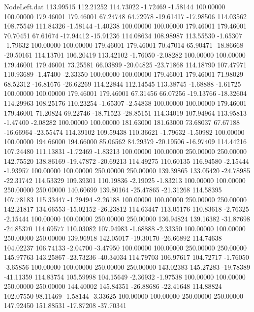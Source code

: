 \begin{filecontents}{NodeLeft.dat}
 113.99515  112.21252  114.73022    -1.72469   -1.58144  100.00000  100.00000  179.46001  179.46001   67.24748   64.72978  -19.61417  -17.98506
 114.03562  108.75549  111.84326    -1.58144   -1.40238  100.00000  100.00000  179.46001  179.46001   70.70451   67.61674  -17.94412  -15.91236
 114.08634  108.98987  113.55530    -1.65307   -1.79632  100.00000  100.00000  179.46001  179.46001   70.47014   65.90471  -18.86668  -20.50161
 114.13701  106.20419  113.42102    -1.76050   -2.08282  100.00000  100.00000  179.46001  179.46001   73.25581   66.03899  -20.04825  -23.71868
 114.18790  107.47971  110.93689    -1.47400   -2.33350  100.00000  100.00000  179.46001  179.46001   71.98029   68.52312  -16.81676  -26.62269
 114.22844  112.14545  113.38745    -1.68888   -1.61725  100.00000  100.00000  179.46001  179.46001   67.31456   66.07256  -19.13766  -18.32604
 114.29963  108.25176  110.23254    -1.65307   -2.54838  100.00000  100.00000  179.46001  179.46001   71.20824   69.22746  -18.71523  -28.85151
 114.34019  107.94964  113.95813    -1.47400   -2.08282  100.00000  100.00000  181.63000  181.63000   73.68037   67.67188  -16.66964  -23.55474
 114.39102  109.59438  110.36621    -1.79632   -1.50982  100.00000  100.00000  194.66000  194.66000   85.06562   84.29379  -20.19506  -16.97409
 114.44216  107.24480  111.13831    -1.72469   -1.83213  100.00000  100.00000  250.00000  250.00000  142.75520  138.86169  -19.47872  -20.69213
 114.49275  110.60135  116.94580    -2.15444   -1.93957  100.00000  100.00000  250.00000  250.00000  139.39865  133.05420  -24.78985  -22.31742
 114.53329  109.39301  110.19836    -2.19025   -1.83213  100.00000  100.00000  250.00000  250.00000  140.60699  139.80164  -25.47865  -21.31268
 114.58395  107.78183  115.33447    -1.29494   -2.26188  100.00000  100.00000  250.00000  250.00000  142.21817  134.66553  -15.02152  -26.23812
 114.63447  113.05176  110.83618    -2.76325   -2.15444  100.00000  100.00000  250.00000  250.00000  136.94824  139.16382  -31.87698  -24.85370
 114.69577  110.03082  107.94983    -1.68888   -2.33350  100.00000  100.00000  250.00000  250.00000  139.96918  142.05017  -19.30170  -26.66892
 114.74638  104.02237  106.74133    -2.04700   -3.47950  100.00000  100.00000  250.00000  250.00000  145.97763  143.25867  -23.73236  -40.34034
 114.79703  106.97617  104.72717    -1.76050   -3.65856  100.00000  100.00000  250.00000  250.00000  143.02383  145.27283  -19.78389  -41.11359
 114.83754  105.59998  104.15649    -2.36932   -1.97538  100.00000  100.00000  250.00000  250.00000  144.40002  145.84351  -26.88686  -22.41648
 114.88824  102.07550   98.11469    -1.58144   -3.33625  100.00000  100.00000  250.00000  250.00000  147.92450  151.88531  -17.87208  -37.70341

\end{filecontents}
